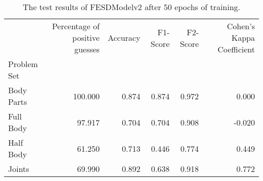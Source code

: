 \begin{table}
      \caption[]{}
      \label{}
          \begin{table}[!htbp]
        \caption[Test Results of FESDModelv2]{The test results of FESDModelv2 after 50 epochs of training.}
        \label{tab:res_v2}
        \begin{tabular}{lrrrrr}
\hline
{} &  Percentage of positive guesses &  Accuracy &  F1-Score &  F2-Score &  Cohen's Kappa Coefficient \\
Problem Set   &                                 &           &           &           &                            \\
\hline
Body Parts &                         100.000 &     0.874 &     0.874 &     0.972 &                      0.000 \\
Full Body  &                          97.917 &     0.704 &     0.704 &     0.908 &                     -0.020 \\
Half Body  &                          61.250 &     0.713 &     0.446 &     0.774 &                      0.449 \\
Joints     &                          69.990 &     0.892 &     0.638 &     0.918 &                      0.772 \\
\hline
\end{tabular}

    \end{table}
  \end{table}